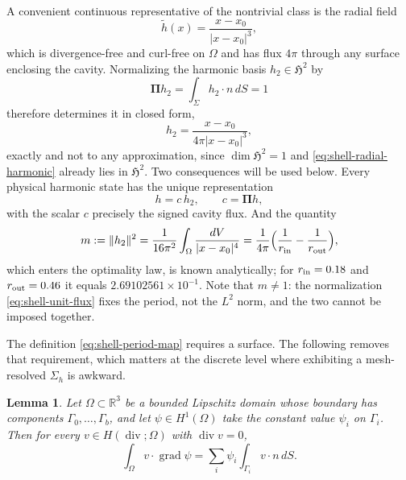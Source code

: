 \documentclass{article}
\newtheorem{lemma}{Lemma}[section]
\DeclareMathOperator{\divergence}{div}
\newcommand{\R} {\mathbb R}
\newcommand{\HH}{\mathfrak H}
\newcommand{\Piop}{\boldsymbol\Pi}
\newcommand{\norm}[1]{\lVert #1\rVert}
\begin{document}
A convenient continuous representative of the nontrivial class is the
radial field
\begin{equation}\label{eq:shell-radial-harmonic}
  \widetilde h(x)=\frac{x-x_0}{|x-x_0|^3},
\end{equation}
which is divergence-free and curl-free on $\Omega$ and has flux $4\pi$
through any surface enclosing the cavity. Normalizing the harmonic
basis $h_2\in\HH^2$ by
\begin{equation}\label{eq:shell-unit-flux}
  \Piop h_2=\int_\Sigma h_2\cdot n\,dS=1
\end{equation}
therefore determines it in closed form,
\begin{equation}\label{eq:shell-h2-closed}
  h_2=\frac{x-x_0}{4\pi|x-x_0|^3},
\end{equation}
exactly and not to any approximation, since $\dim\HH^2=1$ and
\eqref{eq:shell-radial-harmonic} already lies in $\HH^2$. Two
consequences will be used below. Every physical harmonic state has the
unique representation
\begin{equation}\label{eq:shell-harmonic-coordinate}
  h=c\,h_2,\qquad c=\Piop h ,
\end{equation}
with the scalar $c$ precisely the signed cavity flux. And the quantity
\begin{equation}\label{eq:shell-m-closed}
  m:=\norm{h_2}^2
   =\frac{1}{16\pi^2}\int_\Omega\frac{dV}{|x-x_0|^4}
   =\frac{1}{4\pi}\Bigl(\frac{1}{r_{\rm in}}-\frac{1}{r_{\rm out}}\Bigr),
\end{equation}
which enters the optimality law, is known analytically; for
$r_{\rm in}=0.18$ and $r_{\rm out}=0.46$ it equals
$2.69102561\times10^{-1}$. Note that $m\neq1$: the normalization
\eqref{eq:shell-unit-flux} fixes the period, not the $L^2$ norm, and
the two cannot be imposed together.
 
The definition \eqref{eq:shell-period-map} requires a surface. The
following removes that requirement, which matters at the discrete level
where exhibiting a mesh-resolved $\Sigma_h$ is awkward.
 
\begin{lemma}\label{lem:flux-period}
Let $\Omega\subset\R^3$ be a bounded Lipschitz domain whose boundary
has components $\Gamma_0,\dots,\Gamma_b$, and let $\psi\in H^1(\Omega)$
take the constant value $\psi_i$ on $\Gamma_i$. Then for every
$v\in H(\divergence;\Omega)$ with $\divergence v=0$,
\begin{equation}\label{eq:flux-period}
  \int_\Omega v\cdot\operatorname{grad}\psi
  =\sum_i\psi_i\int_{\Gamma_i}v\cdot n\,dS .
\end{equation}
\end{lemma}
 
\end{document}
